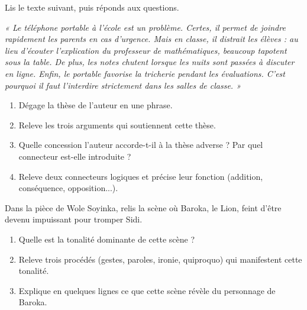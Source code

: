 \documentclass[11pt]{article}
\newcounter{popsec}
\newcounter{popsub}
\newcommand{\courssub}[1]{%
  \stepcounter{popsub}%
  \par\vspace{9pt}\noindent{\popxbold\fontsize{11.5}{13}\selectfont\color{popink}{\color{poporange}\thepopsec.\thepopsub}\hspace{6pt}#1}\par\nopagebreak\vspace{4pt}
}
\begin{document}
\begin{exercice}
Lis le texte suivant, puis réponds aux questions.

\emph{« Le téléphone portable à l'école est un problème. Certes, il permet de joindre rapidement les parents en cas d'urgence. Mais en classe, il distrait les élèves : au lieu d'écouter l'explication du professeur de mathématiques, beaucoup tapotent sous la table. De plus, les notes chutent lorsque les nuits sont passées à discuter en ligne. Enfin, le portable favorise la tricherie pendant les évaluations. C'est pourquoi il faut l'interdire strictement dans les salles de classe. »}
\begin{enumerate}
\item Dégage la thèse de l'auteur en une phrase.
\item Releve les trois arguments qui soutiennent cette thèse.
\item Quelle concession l'auteur accorde-t-il à la thèse adverse ? Par quel connecteur est-elle introduite ?
\item Releve deux connecteurs logiques et précise leur fonction (addition, conséquence, opposition...).
\end{enumerate}
\end{exercice}

\begin{exercice}
Dans la pièce de Wole Soyinka, relis la scène où Baroka, le Lion, feint d'être devenu impuissant pour tromper Sidi.
\begin{enumerate}
\item Quelle est la tonalité dominante de cette scène ?
\item Releve trois procédés (gestes, paroles, ironie, quiproquo) qui manifestent cette tonalité.
\item Explique en quelques lignes ce que cette scène révèle du personnage de Baroka.
\end{enumerate}
\end{exercice}

\courssub{Je me prépare au Bac}
\end{document}
